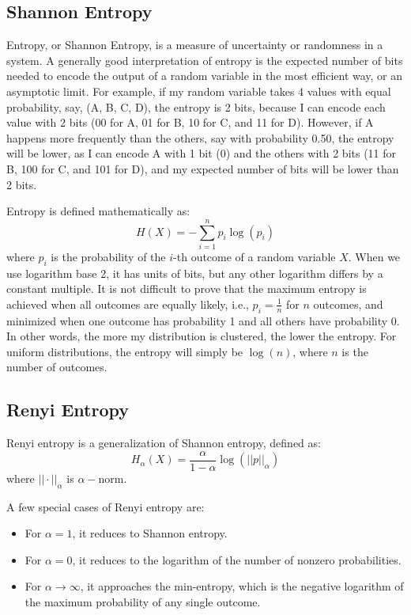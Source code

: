 \documentclass[12pt]{article}
\begin{document}
\subsection{Shannon Entropy}
Entropy, or Shannon Entropy, is a measure of uncertainty or randomness in a system. A generally good interpretation of entropy is the expected number of bits needed to encode the output of a random variable in the most efficient way, or an asymptotic limit. For example, if my random variable takes 4 values with equal probability, say, (A, B, C, D), the entropy is 2 bits, because I can encode each value with 2 bits (00 for A, 01 for B, 10 for C, and 11 for D). However, if A happens more frequently than the others, say with probability 0.50, the entropy will be lower, as I can encode A with 1 bit (0) and the others with 2 bits (11 for B, 100 for C, and 101 for D), and my expected number of bits will be lower than 2 bits. 

Entropy is defined mathematically as:
\[H(X) = -\sum_{i=1}^{n} p_i \log(p_i)\]
where \(p_i\) is the probability of the \(i\)-th outcome of a random variable \(X\). When we use logarithm base 2, it has units of bits, but any other logarithm differs by a constant multiple.
It is not difficult to prove that the maximum entropy is achieved when all outcomes are equally likely, i.e., \(p_i = \frac{1}{n}\) for \(n\) outcomes, and minimized when one outcome has probability 1 and all others have probability 0. In other words, the more my distribution is clustered, the lower the entropy. For uniform distributions, the entropy will simply be \(\log(n)\), where \(n\) is the number of outcomes.

\subsection{Renyi Entropy}
Renyi entropy is a generalization of Shannon entropy, defined as:
\[H_\alpha(X) = \frac{\alpha}{1-\alpha} \log \left(|| p ||_\alpha\right)\]
where \(|| \cdot ||_\alpha\) is \(\alpha-\)norm. 

A few special cases of Renyi entropy are:
\begin{itemize}
    \item For \(\alpha = 1\), it reduces to Shannon entropy.
    \item For \(\alpha = 0\), it reduces to the logarithm of the number of nonzero probabilities.
    \item For \(\alpha \to \infty\), it approaches the min-entropy, which is the negative logarithm of the maximum probability of any single outcome.
\end{itemize}
\end{document}
